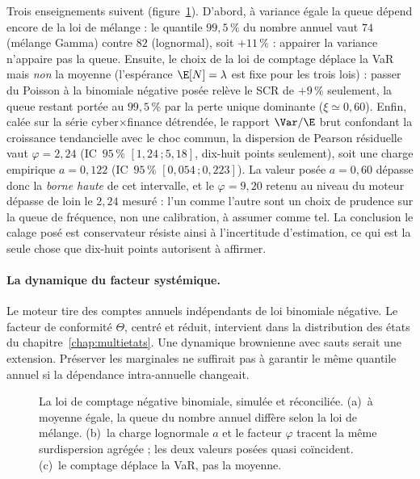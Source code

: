 Trois enseignements suivent (figure~\ref{soc:fig:nb}). D'abord, à variance égale la queue
dépend encore de la loi de mélange : le quantile $99{,}5\,\%$ du nombre annuel vaut $74$
(mélange Gamma) contre $82$ (lognormal), soit $+11\,\%$ : appairer la variance n'appaire pas
la queue. Ensuite, le choix de la loi de comptage déplace la VaR mais \emph{non} la moyenne
(l'espérance $\E[N]=\lambda$ est fixe pour les trois lois) : passer du Poisson à la binomiale
négative posée relève le SCR de $+9\,\%$ seulement, la queue restant portée au $99{,}5\,\%$ par
la perte unique dominante ($\xi\simeq 0{,}60$). Enfin, calée sur la série cyber$\times$finance
détrendée, le rapport $\Var/\E$ brut confondant la croissance tendancielle avec le choc
commun, la dispersion de Pearson résiduelle vaut $\varphi=2{,}24$
(IC~$95\,\%$ $[1{,}24\,;5{,}18]$, dix-huit points seulement), soit une charge empirique
$a=0{,}122$ (IC~$95\,\%$ $[0{,}054\,;0{,}223]$). La valeur posée $a=0{,}60$ dépasse donc la
\emph{borne haute} de cet intervalle, et le $\varphi=9{,}20$ retenu au niveau du moteur
dépasse de loin le $2{,}24$ mesuré : l'un comme l'autre sont un choix de prudence sur
la queue de fréquence, non une calibration, à assumer comme tel. La conclusion
\og{}le calage posé est conservateur\fg{} résiste ainsi à l'incertitude d'estimation, ce qui
est la seule chose que dix-huit points autorisent à affirmer.

\paragraph{La dynamique du facteur systémique.} Le moteur tire des comptes annuels indépendants
de loi binomiale négative. Le facteur de conformité $\Theta$, centré
et réduit, intervient dans la distribution des états du chapitre~\ref{chap:multietats}.
Une dynamique brownienne avec sauts serait une extension. Préserver les marginales ne suffirait
pas à garantir le même quantile annuel si la dépendance intra-annuelle changeait.

\begin{figure}[htbp]\centering
{}
\caption{La loi de comptage négative binomiale, simulée et réconciliée. (a)~à moyenne égale,
la queue du nombre annuel diffère selon la loi de mélange. (b)~la charge lognormale $a$ et le
facteur $\varphi$ tracent la même surdispersion agrégée ; les deux valeurs posées quasi
coïncident. (c)~le comptage déplace la VaR, pas la moyenne.}
\label{soc:fig:nb}
\end{figure}

